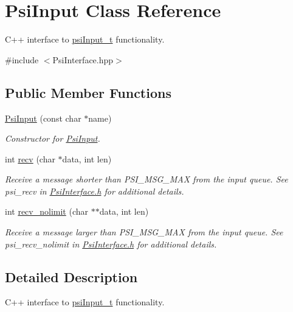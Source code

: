 \hypertarget{classPsiInput}{}\section{Psi\+Input Class Reference}
\label{classPsiInput}


C++ interface to \hyperlink{structpsiInput__t}{psi\+Input\+\_\+t} functionality.  




{\ttfamily \#include $<$Psi\+Interface.\+hpp$>$}

\subsection*{Public Member Functions}
\begin{DoxyCompactItemize}
\item 
\hyperlink{classPsiInput_ac796a2dbddfc6b6aa54841d8c762cc6c}{Psi\+Input} (const char $\ast$name)
\begin{DoxyCompactList}\small\item\em Constructor for \hyperlink{classPsiInput}{Psi\+Input}. \end{DoxyCompactList}\item 
int \hyperlink{classPsiInput_a480b3f1424806a23c3a1c77d590eb216}{recv} (char $\ast$data, int len)
\begin{DoxyCompactList}\small\item\em Receive a message shorter than P\+S\+I\+\_\+\+M\+S\+G\+\_\+\+M\+AX from the input queue. See psi\+\_\+recv in \hyperlink{PsiInterface_8h_source}{Psi\+Interface.\+h} for additional details. \end{DoxyCompactList}\item 
int \hyperlink{classPsiInput_a9410879a8e96915adcad5d6ebb5f224c}{recv\+\_\+nolimit} (char $\ast$$\ast$data, int len)
\begin{DoxyCompactList}\small\item\em Receive a message larger than P\+S\+I\+\_\+\+M\+S\+G\+\_\+\+M\+AX from the input queue. See psi\+\_\+recv\+\_\+nolimit in \hyperlink{PsiInterface_8h_source}{Psi\+Interface.\+h} for additional details. \end{DoxyCompactList}\end{DoxyCompactItemize}


\subsection{Detailed Description}
C++ interface to \hyperlink{structpsiInput__t}{psi\+Input\+\_\+t} functionality. 

